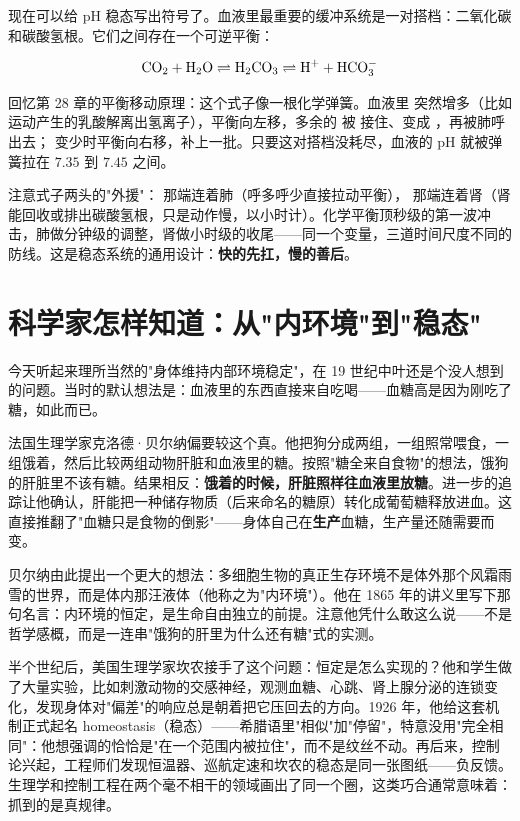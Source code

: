 现在可以给 pH 稳态写出符号了。血液里最重要的缓冲系统是一对搭档：二氧化碳和碳酸氢根。它们之间存在一个可逆平衡：

\[\mathrm{CO_2} + \mathrm{H_2O} \rightleftharpoons \mathrm{H_2CO_3} \rightleftharpoons \mathrm{H^{+}} + \mathrm{HCO_3^{-}}\]

回忆第 28 章的平衡移动原理：这个式子像一根化学弹簧。血液里  突然增多（比如运动产生的乳酸解离出氢离子），平衡向左移，多余的  被  接住、变成 ，再被肺呼出去； 变少时平衡向右移，补上一批。只要这对搭档没耗尽，血液的 pH 就被弹簧拉在 $7.35$ 到 $7.45$ 之间。

注意式子两头的"外援"： 那端连着肺（呼多呼少直接拉动平衡）， 那端连着肾（肾能回收或排出碳酸氢根，只是动作慢，以小时计）。化学平衡顶秒级的第一波冲击，肺做分钟级的调整，肾做小时级的收尾——同一个变量，三道时间尺度不同的防线。这是稳态系统的通用设计：\textbf{快的先扛，慢的善后}。

\section{科学家怎样知道：从"内环境"到"稳态"}

\begin{zhengju}
今天听起来理所当然的"身体维持内部环境稳定"，在 19 世纪中叶还是个没人想到的问题。当时的默认想法是：血液里的东西直接来自吃喝——血糖高是因为刚吃了糖，如此而已。

法国生理学家克洛德·贝尔纳偏要较这个真。他把狗分成两组，一组照常喂食，一组饿着，然后比较两组动物肝脏和血液里的糖。按照"糖全来自食物"的想法，饿狗的肝脏里不该有糖。结果相反：\textbf{饿着的时候，肝脏照样往血液里放糖}。进一步的追踪让他确认，肝能把一种储存物质（后来命名的糖原）转化成葡萄糖释放进血。这直接推翻了"血糖只是食物的倒影"——身体自己在\textbf{生产}血糖，生产量还随需要而变。

贝尔纳由此提出一个更大的想法：多细胞生物的真正生存环境不是体外那个风霜雨雪的世界，而是体内那汪液体（他称之为"内环境"）。他在 1865 年的讲义里写下那句名言：内环境的恒定，是生命自由独立的前提。注意他凭什么敢这么说——不是哲学感概，而是一连串"饿狗的肝里为什么还有糖"式的实测。

半个世纪后，美国生理学家坎农接手了这个问题：恒定是怎么实现的？他和学生做了大量实验，比如刺激动物的交感神经，观测血糖、心跳、肾上腺分泌的连锁变化，发现身体对"偏差"的响应总是朝着把它压回去的方向。1926 年，他给这套机制正式起名 homeostasis（稳态）——希腊语里"相似"加"停留"，特意没用"完全相同"：他想强调的恰恰是"在一个范围内被拉住"，而不是纹丝不动。再后来，控制论兴起，工程师们发现恒温器、巡航定速和坎农的稳态是同一张图纸——负反馈。生理学和控制工程在两个毫不相干的领域画出了同一个圈，这类巧合通常意味着：抓到的是真规律。
\end{zhengju}

